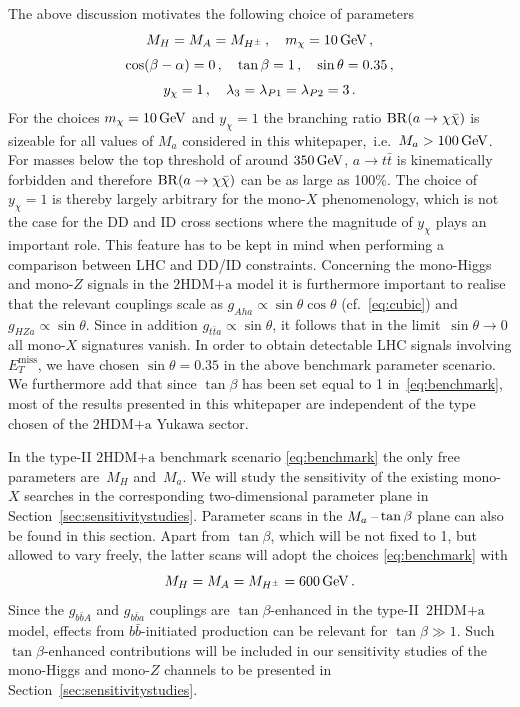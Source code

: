 \documentclass[a4paper, 11pt,notoc]{article}
\newcommand{\MET}{\ensuremath{E_T^\mathrm{miss}}\xspace}
\newcommand{\hdma}{\ensuremath{\textrm{2HDM+a}}\xspace}
\begin{document}
The above discussion motivates the following choice of parameters
\begin{gather} 
 M_H  = M_A = M_{H^\pm} \,, \quad m_\chi = 10 \, {\rm GeV} \,,\notag  \\[1mm]
\cos (\beta - \alpha) = 0\,, \quad   \tan \beta = 1\,, \quad  \sin\theta = 0.35\,, \label{eq:benchmark} \\[1mm]
y_\chi  = 1\,, \quad \lambda_3 =  \lambda_{P1} = \lambda_{P2} =3 \,. \notag 
\end{gather}
For the choices $m_\chi = 10 \, {\rm GeV}$ and $y_\chi  = 1$ the  branching ratio ${\rm BR} (a \to \chi \bar \chi)$ is sizeable for all values of $M_a$ considered in this whitepaper,~i.e.~$M_a > 100 \, {\rm GeV}$. For masses below the top threshold of around $350 \, {\rm GeV}$, $a \to t \bar t$ is  kinematically forbidden and therefore ${\rm BR} (a \to \chi \bar \chi)$ can be as large as 100\%.  The choice of~$y_\chi  = 1$ is thereby largely arbitrary for the mono-$X$ phenomenology, which is not the case for the DD and ID cross sections where the magnitude of $y_\chi$ plays an important role. This feature  has to be  kept in mind when performing a comparison between LHC and DD/ID constraints. Concerning the mono-Higgs and mono-$Z$ signals in the \hdma model it is furthermore important to realise that the relevant couplings scale as $g_{Aha} \propto \sin \theta \cos \theta$  (cf.~\eqref{eq:cubic}) and $g_{HZa} \propto \sin \theta$. Since in addition $g_{t \bar t a} \propto \sin \theta$,  it follows that in the limit~$\sin \theta \to 0$ all mono-$X$ signatures vanish. In order to obtain detectable LHC signals involving $\MET$, we have chosen $\sin\theta = 0.35$ in the above benchmark parameter scenario. We furthermore add that since $\tan \beta$ has been set equal to 1 in~\eqref{eq:benchmark}, most of the results presented in this whitepaper are independent of the type chosen of the \hdma Yukawa sector. 

In the  type-II \hdma  benchmark scenario \eqref{eq:benchmark} the only free parameters are~$M_H$ and~$M_a$. We will study the sensitivity of the existing mono-$X$ searches in the corresponding two-dimensional parameter plane in Section~\ref{sec:sensitivitystudies}. Parameter scans in the $M_a\hspace{0.5mm}$--$\hspace{0.5mm}\tan \beta$ plane can also be found in this section.  Apart from $\tan \beta$, which will be not fixed to 1, but allowed to vary freely, the latter  scans  will adopt the choices \eqref{eq:benchmark} with  
\begin{equation} \label{eq:matbscan}
M_H  = M_A = M_{H^\pm} =  600 \, {\rm GeV} \,.
\end{equation} 
Since the $g_{b \bar b A}$ and $g_{b \bar b a}$ couplings are $\tan \beta$-enhanced in the type-II~\hdma model,  effects from $b \bar b$-initiated production can be relevant  for $\tan \beta \gg 1$. Such $\tan \beta$-enhanced contributions will be included in our sensitivity studies of the mono-Higgs and mono-$Z$ channels to be presented in Section~\ref{sec:sensitivitystudies}. 
\end{document}
